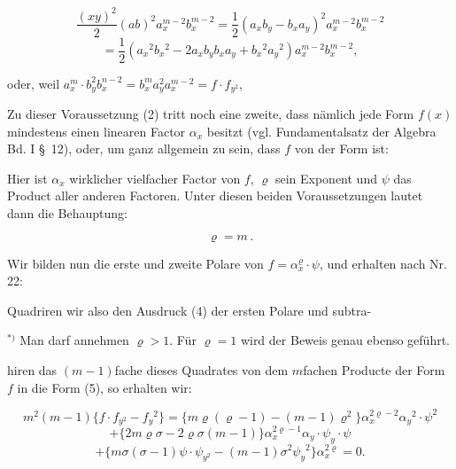 \[
\frac{(xy)^2}{2}(ab)^2 a_x^{m-2}b_x^{m-2} = \frac{1}{2}(a_x b_y - b_x a_y)^2 a_x^{m-2}b_x^{m-2}
\]
\[
= \frac{1}{2}(a_x{}^2 b_x{}^2 - 2a_x b_y b_x a_y + b_x{}^2 a_y{}^2)a_x^{m-2}b_x^{m-2},
\]

oder, weil $a_x^m\cdot b_y^2 b_x^{n-2} = b_x^m a_y^2 a_x^{m-2} = f\cdot f_{y^2}$,


Zu dieser Voraussetzung (2) tritt noch eine zweite, dass nämlich jede Form $f(x)$ mindestens einen linearen Factor $\alpha_x$ besitzt (vgl. Fundamentalsatz der Algebra Bd. I \S~12), oder, um ganz allgemein zu sein, dass $f$ von der Form ist:


Hier ist $\alpha_x$ wirklicher vielfacher Factor von $f$, $\varrho$ sein Exponent und $\psi$ das Product aller anderen Factoren. Unter diesen beiden Voraussetzungen lautet dann die Behauptung:

\[
\varrho = m\,.
\]

Wir bilden nun die erste und zweite Polare von $f = \alpha_x^{\varrho}\cdot\psi$, und erhalten nach Nr. 22:



Quadriren wir also den Ausdruck (4) der ersten Polare und subtra-

\medskip
\noindent{}$^{*)}$ Man darf annehmen $\varrho > 1$. Für $\varrho = 1$ wird der Beweis genau ebenso geführt.


hiren das $(m-1)$fache dieses Quadrates von dem $m$fachen Producte der Form $f$ in die Form (5), so erhalten wir:

\[
m^2(m-1)\{f\cdot f_{y^2} - f_y{}^2\} = \{m\varrho(\varrho-1) - (m-1)\varrho^2\}\alpha_x^{2\varrho-2}\alpha_y{}^2\cdot\psi^2
\]
\[
+ \{2m\varrho\sigma - 2\varrho\sigma(m-1)\}\alpha_x^{2\varrho-1}\alpha_y\cdot\psi_y\cdot\psi
\]
\[
+ \{m\sigma(\sigma-1)\psi\cdot\psi_{y^2} - (m-1)\sigma^2\psi_y{}^2\}\alpha_x^{2\varrho} = 0.
\]

